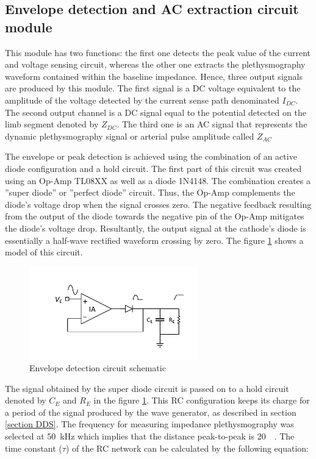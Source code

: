 \subsection{Envelope detection and AC extraction circuit module}
\label{section material envelope}
This module has two functions: the first one detects the peak value of the current and voltage sensing circuit, whereas the other one extracts the plethysmography waveform contained within the baseline impedance. Hence, three output signals are produced by this module. The first signal is a DC voltage equivalent to the amplitude of the voltage detected by the current sense path denominated $I_{DC}$. The second output channel is a DC signal equal to the potential detected on the limb segment denoted by $Z_{DC}$. The third one is an AC signal that represents the dynamic plethysmography signal or arterial pulse amplitude called $Z_{AC}$

The envelope or peak detection is achieved using the combination of an active diode configuration and a hold circuit. The first part of this circuit was created using an Op-Amp TL08XX \cite{ti:TL08xx} as well as a diode 1N4148. The combination creates a ''super diode'' or ''perfect diode'' circuit. Thus, the Op-Amp complements the diode's voltage drop when the signal crosses zero. The negative feedback resulting from the output of the diode towards the negative pin of the Op-Amp mitigates the diode's voltage drop. Resultantly, the output signal at the cathode's diode is essentially a half-wave rectified waveform crossing by zero. The figure \ref{fig:envelope} shows a model of this circuit. 

\begin{figure}[!htpb]
	\centering
	\includegraphics[width=7.3cm,keepaspectratio]{figure5}
	\caption{Envelope detection circuit schematic}
	\label{fig:envelope}
\end{figure}

The signal obtained by the super diode circuit is passed on to a hold circuit denoted by $C_E$ and $R_E$ in the figure \ref{fig:envelope}. This RC configuration keeps its charge for a period of the signal produced by the wave generator, as described in section \ref{section DDS}. The frequency for measuring impedance plethysmography was selected at \SI{50}{\kHz} which implies that the distance peak-to-peak is \SI{20}{\micro\sec}. The time constant ($\tau$) of the RC network can be calculated by the following equation:

